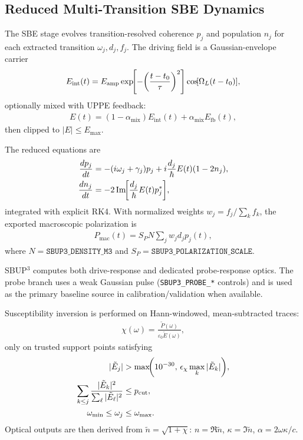 \documentclass[aps,pra,twocolumn,reprint,superscriptaddress,nofootinbib]{revtex4-2}
\let\originalleft\left
\let\originalright\right
\renewcommand{\left}{\mathopen{}\mathclose\bgroup\originalleft}
\renewcommand{\right}{\aftergroup\egroup\originalright}
\begin{document}
\subsection{Reduced Multi-Transition SBE Dynamics}
The SBE stage evolves transition-resolved coherence
$p_j$ and population $n_j$ for each extracted transition $\omega_j,d_j,f_j$. The
driving field is a Gaussian-envelope carrier
\begin{align}
E_{\mathrm{int}}(t)=E_{\mathrm{amp}}
\exp\!\left[-\left(\frac{t-t_0}{\tau}\right)^2\right]
\cos\!\left[\Omega_L(t-t_0)\right],
\end{align}
optionally mixed with UPPE feedback:
\begin{align}
E(t)=(1-\alpha_{\mathrm{mix}})E_{\mathrm{int}}(t)+
\alpha_{\mathrm{mix}}E_{\mathrm{fb}}(t),
\end{align}
then clipped to $|E|\le E_{\max}$.

The reduced equations are
\begin{align}
\frac{dp_j}{dt} &= -\left(i\omega_j+\gamma_j\right)p_j
+ i\frac{d_j}{\hbar}E(t)\left(1-2n_j\right),\\
\frac{dn_j}{dt} &= -2\,\mathrm{Im}\!\left[\frac{d_j}{\hbar}E(t)p_j^*\right],
\end{align}
integrated with explicit RK4. With normalized weights
$w_j=f_j/\sum_k f_k$, the exported macroscopic polarization is
\begin{align}
P_{\mathrm{mac}}(t)=S_P N \sum_j w_j d_j p_j(t),
\end{align}
where $N=\texttt{SBUP3\_DENSITY\_M3}$ and
$S_P=\texttt{SBUP3\_POLARIZATION\_SCALE}$.

SBUP$^3$ computes both drive-response and dedicated probe-response optics. The
probe branch uses a weak Gaussian pulse
(\texttt{SBUP3\_PROBE\_*} controls) and is used as the primary baseline source in
calibration/validation when available.

Susceptibility inversion is performed on Hann-windowed, mean-subtracted traces:
\begin{align}
\chi(\omega)=\frac{\tilde{P}(\omega)}{\varepsilon_0\tilde{E}(\omega)},
\end{align}
only on trusted support points satisfying
\begin{align}
|\tilde{E}_j| &> \max\!\left(10^{-30},\,\epsilon_{\chi}\max_k|\tilde{E}_k|\right),\\
\sum_{k\le j}\frac{|\tilde{E}_k|^2}{\sum_\ell |\tilde{E}_\ell|^2} &\le p_{\mathrm{cut}},\\
\omega_{\min}\le \omega_j &\le \omega_{\max}.
\end{align}
Optical outputs are then derived from $\tilde{n}=\sqrt{1+\chi}$:
$n=\Re \tilde{n}$, $\kappa=\Im \tilde{n}$, $\alpha=2\omega\kappa/c$.
\end{document}
